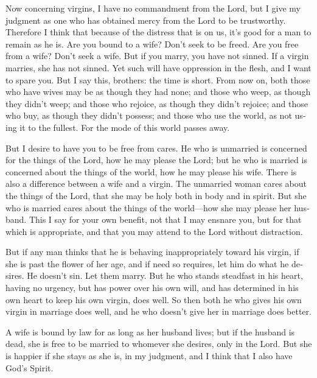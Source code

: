 \begin{paracol}{2}
\begin{otherlanguage}{english}
 Now concerning virgins, I have no commandment from the
Lord, but I give my judgment as one who has obtained mercy from the Lord
to be trustworthy.  Therefore I think that because of the
distress that is on us, it's good for a man to remain as he is.
 Are you bound to a wife? Don't seek to be freed. Are you
free from a wife? Don't seek a wife.  But if you marry,
you have not sinned. If a virgin marries, she has not sinned. Yet such
will have oppression in the flesh, and I want to spare you.
 But I say this, brothers: the time is short. From now
on, both those who have wives may be as though they had none;
 and those who weep, as though they didn't weep; and
those who rejoice, as though they didn't rejoice; and those who buy, as
though they didn't possess;  and those who use the world,
as not using it to the fullest. For the mode of this world passes away.

 But I desire to have you to be free from cares. He who
is unmarried is concerned for the things of the Lord, how he may please
the Lord;  but he who is married is concerned about the
things of the world, how he may please his wife.  There
is also a difference between a wife and a virgin. The unmarried woman
cares about the things of the Lord, that she may be holy both in body
and in spirit. But she who is married cares about the things of the
world---how she may please her husband.  This I say for
your own benefit, not that I may ensnare you, but for that which is
appropriate, and that you may attend to the Lord without distraction.

 But if any man thinks that he is behaving
inappropriately toward his virgin, if she is past the flower of her age,
and if need so requires, let him do what he desires. He doesn't sin. Let
them marry.  But he who stands steadfast in his heart,
having no urgency, but has power over his own will, and has determined
in his own heart to keep his own virgin, does well.  So
then both he who gives his own virgin in marriage does well, and he who
doesn't give her in marriage does better.

 A wife is bound by law for as long as her husband lives;
but if the husband is dead, she is free to be married to whomever she
desires, only in the Lord.  But she is happier if she
stays as she is, in my judgment, and I think that I also have God's
Spirit.


\end{otherlanguage}
\end{paracol}
